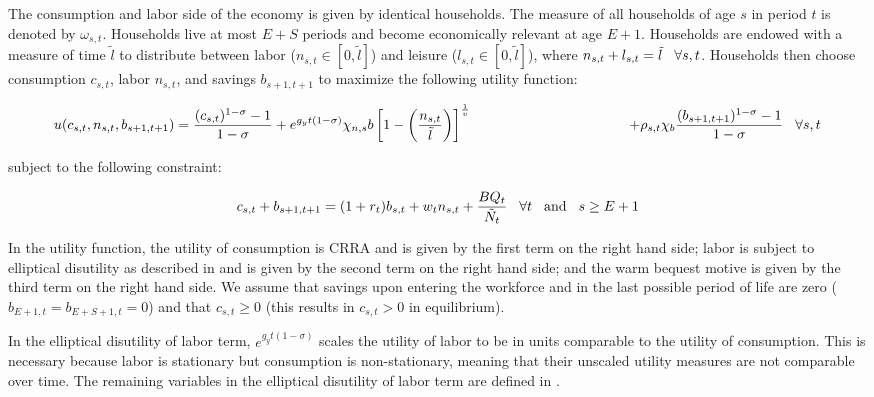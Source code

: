 \documentclass[10pt]{article}
\numberwithin{equation}{subsection}
\begin{document}
\begin{appendices}
\par The consumption and labor side of the economy is given by identical households. The measure of all households of age \(s\) in period \(t\) is denoted by \(\omega_{s,t}\). Households live at most \(E+S\) periods and become economically relevant at age \(E+1\). Households are endowed with a measure of time \(\tilde{l}\) to distribute between labor (\(n_{s,t} \in [0,\tilde{l}]\)) and leisure (\(l_{s,t} \in [0,\tilde{l}]\)), where \(n_{s,t} + l_{s,t} = \tilde{l} \hspace{3mm} \forall s, t\). Households then choose consumption \(c_{s,t}\), labor \(n_{s,t}\), and savings \(b_{s+1,t+1}\) to maximize the following utility function:

\begin{dmath}
   {u(c_{s,t}, n_{s,t}, b_{s+1,t+1}) = \frac{(c_{s,t})^{1-\sigma}-1}{1-\sigma} + e^{g_yt(1-\sigma)}\chi_{n,s}b\left[1-\left(\frac{n_{s,t}}{\tilde{l}}\right)\right]^{\frac{1}{\upsilon}}} \label{eq:hh_utility} \\
   {\hspace{40mm} + \rho_{s,t}\chi_b\frac{(b_{s+1,t+1})^{1-\sigma}-1}{1-\sigma} \hspace{3mm} \forall s,t}
\end{dmath}

\noindent subject to the following constraint:

\begin{equation}
   c_{s,t} + b_{s+1,t+1} = (1+r_t)b_{s,t} + w_tn_{s,t} + \frac{BQ_t}{\tilde{N}_t} \hspace{3mm} \forall t \hspace{3mm} \text{and} \hspace{3mm} s \geq E+1
\end{equation}

\par In the utility function, the utility of consumption is CRRA and is given by the first term on the right hand side; labor is subject to elliptical disutility as described in \cite{DE2018} and is given by the second term on the right hand side; and the warm bequest motive is given by the third term on the right hand side. We assume that savings upon entering the workforce and in the last possible period of life are zero (\(b_{E+1,t} = b_{E+S+1,t} = 0\)) and that \(c_{s,t} \geq 0\) (this results in \(c_{s,t} > 0\) in equilibrium).

\par In the elliptical disutility of labor term, \(e^{g_yt(1-\sigma)}\) scales the utility of labor to be in units comparable to the utility of consumption. This is necessary because labor is stationary but consumption is non-stationary, meaning that their unscaled utility measures are not comparable over time. The remaining variables in the elliptical disutility of labor term are defined in \cite{DE2018}.


\end{appendices}
\end{document}
